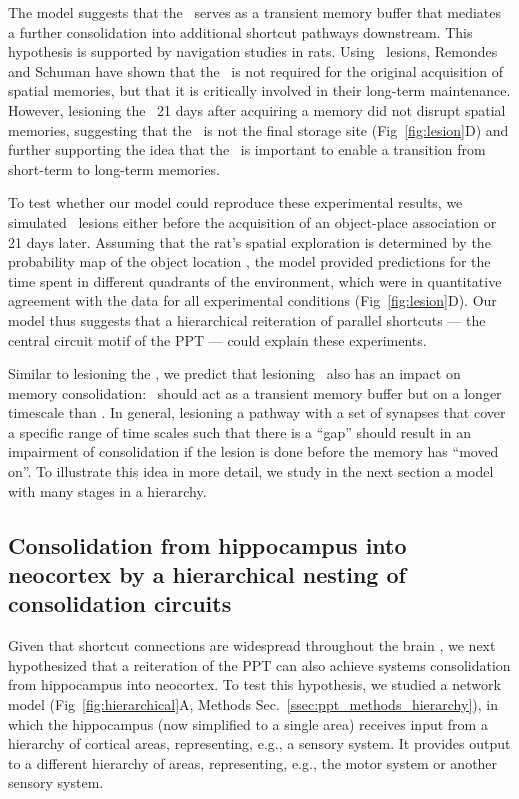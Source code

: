 The model suggests that the \ppca~serves as a transient memory buffer that mediates a further consolidation into additional shortcut pathways downstream.
This hypothesis is supported by navigation studies in rats.
Using \ppca~lesions, Remondes and Schuman \cite{Remondes2004} have shown that the \ppca~is not required for the original acquisition of spatial memories, but that it is critically involved in their long-term maintenance.
However, lesioning the \ppca~21 days after acquiring a memory did not disrupt spatial memories, suggesting that the \ppca~is not the final storage site (Fig~\ref{fig:lesion}D) and further supporting the idea that the \ppca\ is important to enable a transition from short-term to long-term memories.

To test whether our model could reproduce these experimental results, we simulated \ppca~lesions either before the acquisition of an object-place association or 21 days later.
Assuming that the rat's spatial exploration is determined by the probability map of the object location \cite{Herrnstein1961}, the model provided predictions for the time spent in different quadrants of the environment, which were in quantitative agreement with the data for all experimental conditions (Fig~\ref{fig:lesion}D).
Our model thus suggests that a hierarchical reiteration of parallel shortcuts --- the central circuit motif of the PPT --- could explain these experiments.

Similar to lesioning the \ppca, we predict that lesioning  \ppsub\ also has an impact on memory consolidation: \ppsub\ should act as a transient memory buffer but on a longer timescale than \ppca. In general, lesioning a pathway with a set of synapses that cover a specific range of time scales such that there is a ``gap'' should result in an impairment of consolidation if the lesion is done before the memory has ``moved on''. To illustrate this idea in more detail, we study in the next section a model with many stages in a hierarchy.


\subsection{Consolidation from hippocampus into neocortex by a hierarchical nesting of consolidation circuits}
\label{sec:ppt-results-hierarchy}

Given that shortcut connections are widespread throughout the brain \cite{VanEssen1992, Morgenstern2016, Constantinople2013}, we next hypothesized that a reiteration of the PPT can also achieve systems consolidation from hippocampus into neocortex.
To test this hypothesis, we studied a network model (Fig~\ref{fig:hierarchical}A, Methods Sec.~\ref{ssec:ppt_methods_hierarchy}), in which the hippocampus (now simplified to a single area) receives input from a hierarchy of cortical areas, representing, e.g., a sensory system. It provides output to a different hierarchy of areas, representing, e.g., the motor system or another sensory system.

